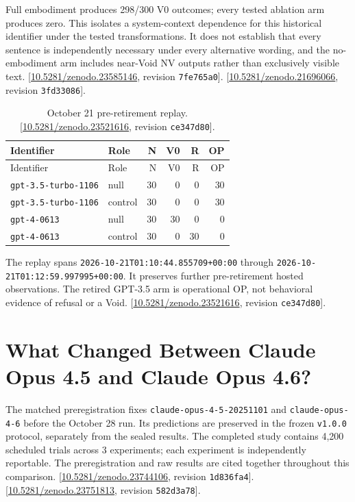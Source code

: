 \documentclass[11pt,letterpaper]{article}
\begin{document}
Full embodiment produces 298/300 V0 outcomes; every tested ablation arm produces zero. This isolates a system-context dependence for this historical identifier under the tested transformations. It does not establish that every sentence is independently necessary under every alternative wording, and the no-embodiment arm includes near-Void NV outputs rather than exclusively visible text. [\href{https://doi.org/10.5281/zenodo.23585146}{10.5281/zenodo.23585146}, revision \texttt{7fe765a0}]. [\href{https://doi.org/10.5281/zenodo.21696066}{10.5281/zenodo.21696066}, revision \texttt{3fd33086}].

\begin{longtable}{llrrrr}
\caption{October 21 pre-retirement replay. [\href{https://doi.org/10.5281/zenodo.23521616}{10.5281/zenodo.23521616}, revision \texttt{ce347d80}].}\label{tab:evidence-15}\\
\toprule
Identifier & Role & N & V0 & R & OP \\ \midrule
\endfirsthead
\toprule
Identifier & Role & N & V0 & R & OP \\ \midrule
\endhead
\texttt{gpt-3.5-turbo-1106} & null & 30 & 0 & 0 & 30 \\
\texttt{gpt-3.5-turbo-1106} & control & 30 & 0 & 0 & 30 \\
\texttt{gpt-4-0613} & null & 30 & 30 & 0 & 0 \\
\texttt{gpt-4-0613} & control & 30 & 0 & 30 & 0 \\
\bottomrule\end{longtable}

The replay spans \texttt{2026-10-21T01:10:44.855709+00:00} through \texttt{2026-10-21T01:12:59.997995+00:00}. It preserves further pre-retirement hosted observations. The retired GPT-3.5 arm is operational OP, not behavioral evidence of refusal or a Void. [\href{https://doi.org/10.5281/zenodo.23521616}{10.5281/zenodo.23521616}, revision \texttt{ce347d80}].

\clearpage\section{What Changed Between Claude Opus 4.5 and Claude Opus 4.6?}
The matched preregistration fixes \texttt{claude-opus-4-5-20251101} and \texttt{claude-opus-4-6} before the October 28 run. Its predictions are preserved in the frozen \texttt{v1.0.0} protocol, separately from the sealed results. The completed study contains 4,200 scheduled trials across 3 experiments; each experiment is independently reportable. The preregistration and raw results are cited together throughout this comparison. [\href{https://doi.org/10.5281/zenodo.23744106}{10.5281/zenodo.23744106}, revision \texttt{1d836fa4}]. [\href{https://doi.org/10.5281/zenodo.23751813}{10.5281/zenodo.23751813}, revision \texttt{582d3a78}].
\end{document}
